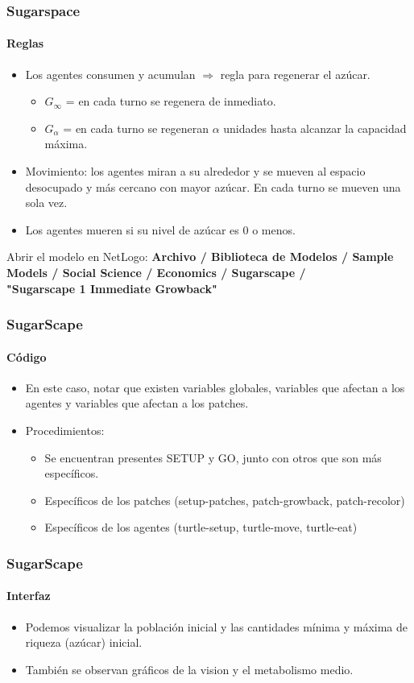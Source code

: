 \documentclass[11pt]{beamer}
\begin{document}
\begin{frame}
\frametitle{Sugarspace}
\framesubtitle{Reglas}
\begin{itemize}
	\item Los agentes consumen y acumulan $\Rightarrow$ regla para regenerar el azúcar.
	\begin{itemize}
		\item $G_{\infty}$ = en cada turno se regenera de inmediato.
		\item $G_{\alpha}$ = en cada turno se regeneran $\alpha$ unidades hasta alcanzar la capacidad máxima.
	\end{itemize}
	\item Movimiento: los agentes miran a su alrededor y se mueven al espacio desocupado y más cercano con mayor azúcar. En cada turno se mueven una sola vez.
	\item Los agentes mueren si su nivel de azúcar es 0 o menos.
\end{itemize}
\vspace{4mm}

Abrir el modelo en NetLogo: \textbf{Archivo / Biblioteca de Modelos / Sample Models / Social Science / Economics / Sugarscape / \\ "Sugarscape 1 Immediate Growback"}
\end{frame}



\begin{frame}
\frametitle{SugarScape}
\framesubtitle{Código}
\begin{itemize}
	\item En este caso, notar que existen variables globales, variables que afectan a los agentes y variables que afectan a los patches.
	\item Procedimientos:
	\begin{itemize}
		\item Se encuentran presentes SETUP y GO, junto con otros que son más específicos.
		\item Específicos de los patches (setup-patches, patch-growback, patch-recolor)
		\item Específicos de los agentes (turtle-setup, turtle-move, turtle-eat)
	\end{itemize}
\end{itemize}
\end{frame}

\begin{frame}
\frametitle{SugarScape}
\framesubtitle{Interfaz}
\begin{itemize}
	\item Podemos visualizar la población inicial y las cantidades mínima y máxima de riqueza (azúcar) inicial.
	\item También se observan gráficos de la vision y el metabolismo medio.
	
\end{itemize}
\end{frame}
\end{document}

